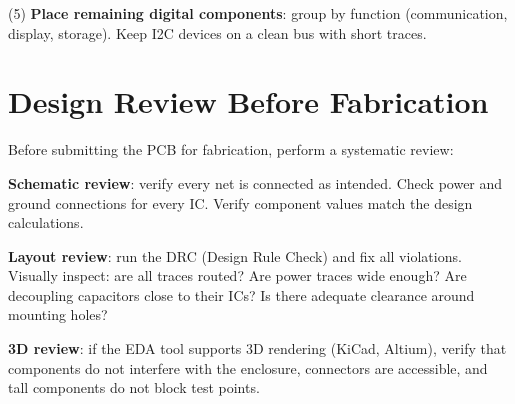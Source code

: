 (5) \textbf{Place remaining digital components}: group by function (communication, display, storage). Keep I2C devices on a clean bus with short traces.

\section{Design Review Before Fabrication}
Before submitting the PCB for fabrication, perform a systematic review:

\textbf{Schematic review}: verify every net is connected as intended. Check power and ground connections for every IC. Verify component values match the design calculations.

\textbf{Layout review}: run the DRC (Design Rule Check) and fix all violations. Visually inspect: are all traces routed? Are power traces wide enough? Are decoupling capacitors close to their ICs? Is there adequate clearance around mounting holes?

\textbf{3D review}: if the EDA tool supports 3D rendering (KiCad, Altium), verify that components do not interfere with the enclosure, connectors are accessible, and tall components do not block test points.

